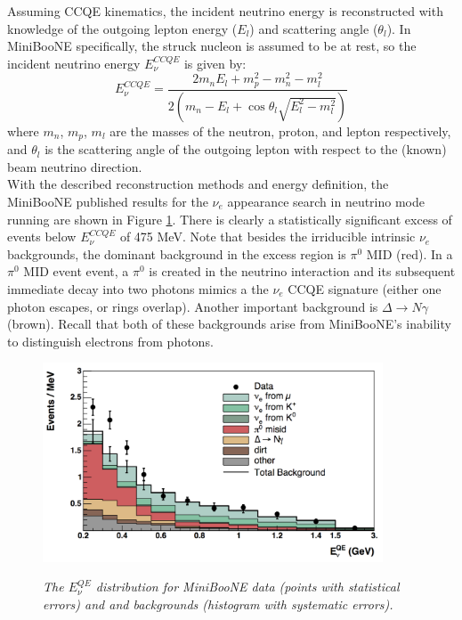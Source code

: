 Assuming CCQE kinematics, the incident neutrino energy is reconstructed with knowledge of the outgoing lepton energy ($E_l$) and scattering angle ($\theta_l$). In MiniBooNE specifically, the struck nucleon is assumed to be at rest, so the incident neutrino energy $E_\nu^{CCQE}$ is given by:
\begin{equation}\label{MB_CCQE_formula}
E_\nu^{CCQE} = \frac{2m_nE_l+m_p^2-m_n^2-m_l^2}{2(m_n-E_l+\cos\theta_l\sqrt{E_l^2-m_l^2})}
\end{equation}
where $m_n$, $m_p$, $m_l$ are the masses of the neutron, proton, and lepton respectively, and $\theta_l$ is the scattering angle of the outgoing lepton with respect to the (known) beam neutrino direction.\\

With the described reconstruction methods and energy definition, the MiniBooNE published results \cite{MBLEEPaper} for the $\nu_e$ appearance search in neutrino mode running are shown in Figure \ref{MB_published_stackedhisto_fig}. There is clearly a statistically significant excess of events below $E_\nu^{CCQE}$ of 475 MeV. Note that besides the irriducible intrinsic $\nu_e$ backgrounds, the dominant background in the excess region is $\pi^0$ MID (red). In a $\pi^0$ MID event event, a $\pi^0$ is created in the neutrino interaction and its subsequent immediate decay into two photons mimics a the $\nu_e$ CCQE signature (either one photon escapes, or rings overlap). Another important background is $\Delta\rightarrow N\gamma$ (brown). Recall that both of these backgrounds arise from MiniBooNE's inability to distinguish electrons from photons.\\


\begin{figure}[ht!]
\centering
	\includegraphics[width=0.9\textwidth]{Figures/MB_published_stackedhisto.png} \\
\caption{\textit{The $E_\nu^{QE}$ distribution for MiniBooNE data (points with statistical errors) and and backgrounds (histogram with systematic errors).}}\label{MB_published_stackedhisto_fig}
\end{figure}

